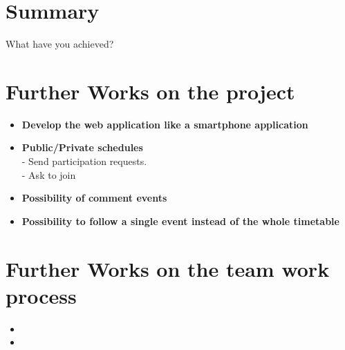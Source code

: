 
\section{Summary}
\vspace{-5mm}
What have you achieved?

\section{Further Works on the project}
\vspace{-5mm}
\begin{itemize}
 \setlength{\itemsep}{-5pt}
\item \textbf{Develop the web application like a smartphone application}

\item \textbf{Public/Private schedules}\\
- Send participation requests.\\
- Ask to join

\item \textbf{Possibility of comment events}

\item \textbf{Possibility to follow a single event instead of the whole timetable}
\end{itemize}

\section{Further Works on the team work process}
\vspace{-5mm}
\begin{itemize}
 \setlength{\itemsep}{-5pt}
 \item
 \item
\end{itemize}